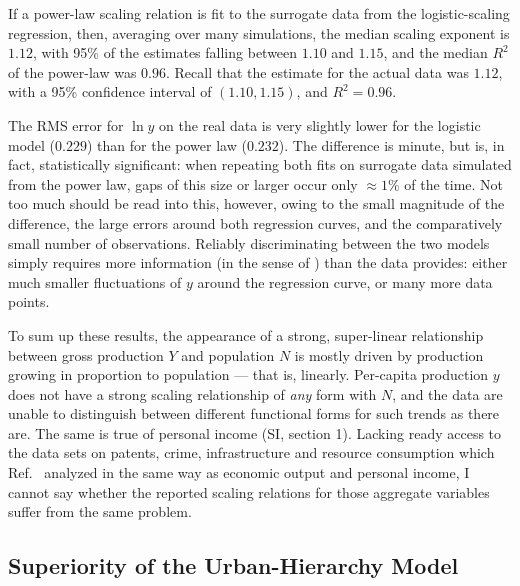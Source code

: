 \documentclass{pnastwo}
\begin{document}
\begin{article}
If a power-law scaling relation is fit to the surrogate data from the
logistic-scaling regression, then, averaging over many simulations, the median
scaling exponent is $1.12$, with 95\% of the estimates falling between $1.10$
and $1.15$, and the median $R^2$ of the power-law was $0.96$.  Recall that the
estimate for the actual data was $1.12$, with a 95\% confidence interval of
$(1.10, 1.15)$, and $R^2=0.96$.

The RMS error for $\ln{y}$ on the real data is very slightly lower for the
logistic model ($0.229$) than for the power law ($0.232$).  The difference is
minute, but is, in fact, statistically significant: when repeating both fits on
surrogate data simulated from the power law, gaps of this size or larger occur
only $\approx 1\%$ of the time.  Not too much should be read into this,
however, owing to the small magnitude of the difference, the large errors
around both regression curves, and the comparatively small number of
observations.  Reliably discriminating between the two models simply requires
more information (in the sense of \cite{Kullback-info-theory-and-stats}) than
the data provides: either much smaller fluctuations of $y$ around the
regression curve, or many more data points.

To sum up these results, the appearance of a strong, super-linear relationship
between gross production $Y$ and population $N$ is mostly driven by production
growing in proportion to population --- that is, linearly.  Per-capita
production $y$ does not have a strong scaling relationship of {\em any} form
with $N$, and the data are unable to distinguish between different functional
forms for such trends as there are.  The same is true of personal income (SI,
section 1).  Lacking ready access to the data sets on patents, crime,
infrastructure and resource consumption which Ref.\
\cite{Bettencout-et-al-growth-innovation-scaling} analyzed in the same way as
economic output and personal income, I cannot say whether the reported scaling
relations for those aggregate variables suffer from the same problem.

\subsection{Superiority of the Urban-Hierarchy Model}


\end{article}
\end{document}
